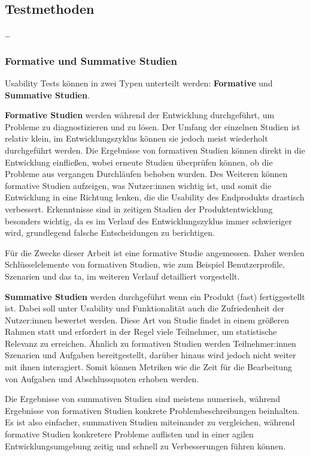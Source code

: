 
\subsection{Testmethoden}
\dots{}

\subsubsection{Formative und Summative Studien}
\label{section:formative-summative}
Usability Tests können in zwei Typen unterteilt werden: \textbf{Formative} und \textbf{Summative
  Studien}.

\textbf{Formative Studien} werden während der Entwicklung durchgeführt, um Probleme zu
diagnostizieren und zu lösen. Der Umfang der einzelnen Studien ist relativ klein, im
Entwicklungszyklus können sie jedoch meist wiederholt durchgeführt werden. Die Ergebnisse von
formativen Studien können direkt in die Entwicklung einfließen, wobei erneute Studien überprüfen
können, ob die Probleme aus vergangen Durchläufen behoben wurden. Des Weiteren können formative
Studien aufzeigen, was Nutzer:innen wichtig ist, und somit die Entwicklung in eine Richtung lenken,
die die Usability des Endprodukts drastisch verbessert. Erkenntnisse sind in zeitigen Stadien der
Produktentwicklung besonders wichtig, da es im Verlauf des Entwicklungszyklus immer schwieriger
wird, grundlegend falsche Entscheidungen zu berichtigen.

Für die Zwecke dieser Arbeit ist eine formative Studie angemessen. Daher werden Schlüsselelemente
von formativen Studien, wie zum Beispiel Benutzerprofile, Szenarien und das \acl{ta}, im weiteren
Verlauf detailliert vorgestellt.

\textbf{Summative Studien} werden durchgeführt wenn ein Produkt (fast) fertiggestellt ist. Dabei
soll unter Usability und Funktionalität auch die Zufriedenheit der Nutzer:innen bewertet werden.
Diese Art von Studie findet in einem größeren Rahmen statt und erfordert in der Regel viele
Teilnehmer, um statistische Relevanz zu erreichen. Ähnlich zu formativen Studien werden
Teilnehmer:innen Szenarien und Aufgaben bereitgestellt, darüber hinaus wird jedoch nicht weiter mit
ihnen interagiert. Somit können Metriken wie die Zeit für die Bearbeitung von Aufgaben und
Abschlussquoten erhoben werden.

Die Ergebnisse von summativen Studien sind meistens numerisch, während Ergebnisse von formativen
Studien konkrete Problembeschreibungen beinhalten. Es ist also einfacher, summativen Studien
miteinander zu vergleichen, während formative Studien konkretere Probleme auflisten und in einer
agilen Entwicklungsumgebung zeitig und schnell zu Verbesserungen führen können.

